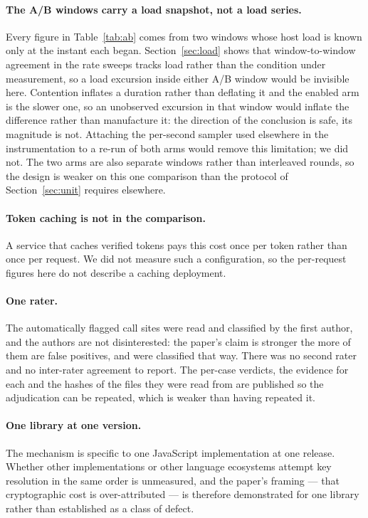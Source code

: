 \documentclass[pdflatex,sn-basic,twocolumn]{sn-jnl}%
\begin{document}
\paragraph{The A/B windows carry a load snapshot, not a load series.} Every
figure in Table~\ref{tab:ab} comes from two windows whose host load is known only
at the instant each began. Section~\ref{sec:load} shows that window-to-window
agreement in the rate sweeps tracks load rather than the condition under
measurement, so a load excursion inside either A/B window would be invisible
here. Contention inflates a duration rather than deflating it and the enabled arm
is the slower one, so an unobserved excursion in that window would inflate the
difference rather than manufacture it: the direction of the conclusion is safe,
its magnitude is not. Attaching the per-second sampler used elsewhere in the
instrumentation to a re-run of both arms would remove this limitation; we did
not. The two arms are also separate windows rather than interleaved rounds, so
the design is weaker on this one comparison than the protocol of
Section~\ref{sec:unit} requires elsewhere.
\fi

\paragraph{Token caching is not in the comparison.} A service that caches
verified tokens pays this cost once per token rather than once per request. We
did not measure such a configuration, so the per-request figures here do not
describe a caching deployment.

\paragraph{One rater.} The \AdjudicatedTotal{} automatically flagged call sites
were read and classified by the first author, and the authors are not
disinterested: the paper's claim is stronger the more of them are false
positives, and \AdjudicatedFalsePositive{} were classified that way. There was no
second rater and no inter-rater agreement to report. The per-case verdicts, the
evidence for each and the hashes of the files they were read from are published
so the adjudication can be repeated, which is weaker than having repeated it.

\paragraph{One library at one version.} The mechanism is specific to one
JavaScript implementation at one release. Whether other implementations or other
language ecosystems attempt key resolution in the same order is unmeasured, and
the paper's framing --- that cryptographic cost is over-attributed --- is
therefore demonstrated for one library rather than established as a class of
defect.
\end{document}
